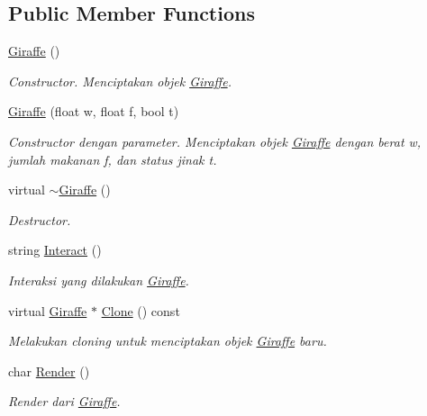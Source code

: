 \subsection*{Public Member Functions}
\begin{DoxyCompactItemize}
\item 
\hyperlink{classGiraffe_a4a396bd3e634243c1740916b71197168}{Giraffe} ()
\begin{DoxyCompactList}\small\item\em Constructor. Menciptakan objek \hyperlink{classGiraffe}{Giraffe}. \end{DoxyCompactList}\item 
\hyperlink{classGiraffe_aa04be26d10955712062e0c0dbf8e6d8f}{Giraffe} (float w, float f, bool t)
\begin{DoxyCompactList}\small\item\em Constructor dengan parameter. Menciptakan objek \hyperlink{classGiraffe}{Giraffe} dengan berat w, jumlah makanan f, dan status jinak t. \end{DoxyCompactList}\item 
virtual \hyperlink{classGiraffe_a1d099c4a2c87fbac26e5bcb33084dcb4}{$\sim$\+Giraffe} ()
\begin{DoxyCompactList}\small\item\em Destructor. \end{DoxyCompactList}\item 
string \hyperlink{classGiraffe_ad73e5ee5fc62f709c52a1cab68f2a1f3}{Interact} ()
\begin{DoxyCompactList}\small\item\em Interaksi yang dilakukan \hyperlink{classGiraffe}{Giraffe}. \end{DoxyCompactList}\item 
virtual \hyperlink{classGiraffe}{Giraffe} $\ast$ \hyperlink{classGiraffe_aa29f8f77477a64fc72f814b7f225c94f}{Clone} () const 
\begin{DoxyCompactList}\small\item\em Melakukan cloning untuk menciptakan objek \hyperlink{classGiraffe}{Giraffe} baru. \end{DoxyCompactList}\item 
char \hyperlink{classGiraffe_a64dccf030fdb54de9fd37f8381c64271}{Render} ()
\begin{DoxyCompactList}\small\item\em Render dari \hyperlink{classGiraffe}{Giraffe}. \end{DoxyCompactList}\end{DoxyCompactItemize}
